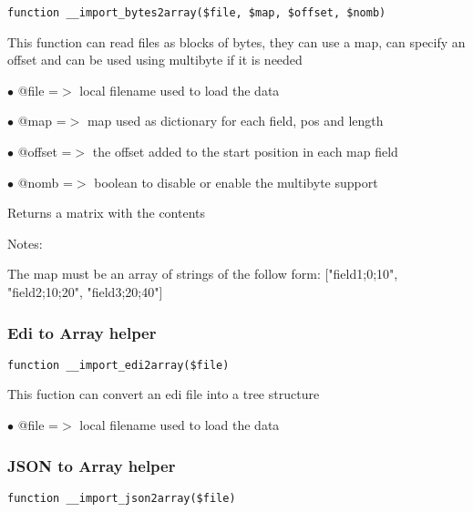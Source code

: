\documentclass[a4paper]{article}
\begin{document}
\begin{lstlisting}
function __import_bytes2array($file, $map, $offset, $nomb)
\end{lstlisting}

This function can read files as blocks of bytes, they can use a map, can specify
an offset and can be used using multibyte if it is needed

\begin{compactitem}
\item[\color{myblue}$\bullet$] @file   =$>$ local filename used to load the data
\item[\color{myblue}$\bullet$] @map    =$>$ map used as dictionary for each field, pos and length
\item[\color{myblue}$\bullet$] @offset =$>$ the offset added to the start position in each map field
\item[\color{myblue}$\bullet$] @nomb   =$>$ boolean to disable or enable the multibyte support
\end{compactitem}

Returns a matrix with the contents

Notes:

The map must be an array of strings of the follow form:
["field1;0;10", "field2;10;20", "field3;20;40"]

\hypertarget{toc469}{}
\subsubsection{Edi to Array helper}

\begin{lstlisting}
function __import_edi2array($file)
\end{lstlisting}

This fuction can convert an edi file into a tree structure

\begin{compactitem}
\item[\color{myblue}$\bullet$] @file =$>$ local filename used to load the data
\end{compactitem}

\hypertarget{toc470}{}
\subsubsection{JSON to Array helper}

\begin{lstlisting}
function __import_json2array($file)
\end{lstlisting}
\end{document}
